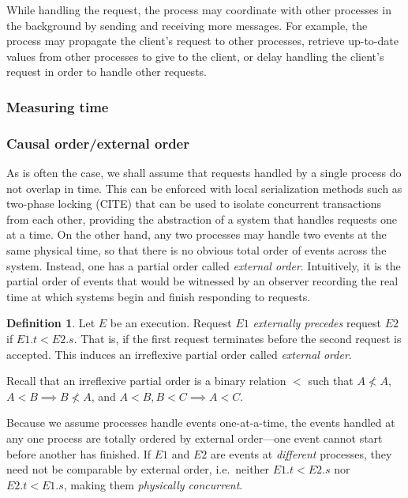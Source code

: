 \documentclass[]             %
{NASA}                       %
\theoremstyle{definition}
\newtheorem{definition}{Definition}[section]
\begin{document}
While handling the request, the process may coordinate with other
processes in the background by sending and receiving more messages. For
example, the process may propagate the client's request to other
processes, retrieve up-to-date values from other processes to give to
the client, or delay handling the client's request in order to handle
other requests.

\hypertarget{measuring-time}{%
\subsubsection{Measuring time}\label{measuring-time}}

\hypertarget{causal-orderexternal-order}{%
\subsubsection{Causal order/external
order}\label{causal-orderexternal-order}}

As is often the case, we shall assume that requests handled by a single
process do not overlap in time. This can be enforced with local
serialization methods such as two-phase locking (CITE) that can be used
to isolate concurrent transactions from each other, providing the
abstraction of a system that handles requests one at a time. On the
other hand, any two processes may handle two events at the same physical
time, so that there is no obvious total order of events across the
system. Instead, one has a partial order called \emph{external order}.
Intuitively, it is the partial order of events that would be witnessed
by an observer recording the real time at which systems begin and finish
responding to requests.

\begin{definition}
Let $E$ be an execution. Request $E1$ \emph{externally precedes}
request $E2$ if $E1.t < E2.s$. That is, if the first request
terminates before the second request is accepted. This induces an
irreflexive partial order called \emph{external order}.
\end{definition}

Recall that an irreflexive partial order is a binary relation \(<\) such
that \(A \not < A\), \(A < B \implies B \not < A\), and
\(A < B, B < C \implies A < C\).

Because we assume processes handle events one-at-a-time, the events
handled at any one process are totally ordered by external order---one
event cannot start before another has finished. If \(E1\) and \(E2\) are
events at \emph{different} processes, they need not be comparable by
external order, i.e.~neither \(E1.t < E2.s\) nor \(E2.t < E1.s\), making
them \emph{physically concurrent}.
\end{document}
